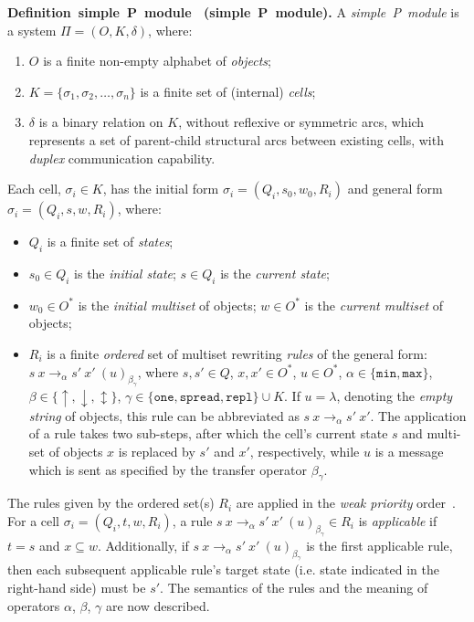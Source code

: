 \documentclass[preliminary,copyright,creativecommons]{eptcs}
\newenvironment{definition}[1][]
   {\refstepcounter{theorem} \par\medskip\noindent
   {\bf Definition~\thetheorem \ifx #1 \else ~(#1)\fi.} 
\ignorespaces }
   {\par\medskip }
\theoremstyle{remark}
\newcommand{\modmin}{\mathtt{min}}
\newcommand{\modmax}{\mathtt{max}}
\newcommand{\modone}{\mathtt{one}}
\newcommand{\modspread}{\mathtt{spread}}
\newcommand{\modrepl}{\mathtt{repl}}
\begin{document}
\begin{definition}[simple~P~module]
\label{def:simple-P-module}
A \emph{simple~P~module} is a system $\Pi = (O, K, \delta)$, where:
\begin{enumerate}
  \item $O$ is a finite non-empty alphabet of \emph{objects};
  \item $K=\{\sigma_1,\sigma_2,\ldots,\sigma_n\}$ is a finite set of (internal) \emph{cells};
  \item $\delta$ is a binary relation on $K$,
      without reflexive or symmetric arcs,
	   which represents a set of parent-child structural arcs between existing cells, 
	   with \emph{duplex} communication capability.
\end{enumerate}

Each cell, $\sigma_i \in K$, 
has the initial form $\sigma_i = (Q_i, s_0, w_0, R_i)$ and 
general form $\sigma_i = (Q_i,s,w,R_i)$, where:  
\begin{itemize}
  \item $Q_i$ is a finite set of \emph{states};
  \item $s_0 \in Q_i$ is the \emph{initial state}; $s\in Q_i$ is the \emph{current
state};
  \item $w_0 \in {O}^*$ is the \emph{initial multiset} of objects;
   $w \in {O}^*$ is the \emph{current multiset} of objects;
  \item $R_i$ is a finite \emph{ordered} set of multiset rewriting \emph{rules} of the general form: 
        $s~x \rightarrow_{\alpha} s'~x'~(u)_{\beta_\gamma}$, 
        where $s,s'\in Q$, $x,x'\in {O}^*$, 
        $u \in {O}^*$, 
        $\alpha \in \{\modmin, \modmax\}$,
        $\beta \in \{\uparrow, \downarrow, \updownarrow\}$,
        $\gamma \in \{\modone, \modspread, \modrepl\} \cup K$.
        If $u=\lambda$, denoting the \emph{empty string} of objects, this rule can be 
abbreviated as $s~x \rightarrow_{\alpha} s'~x'$. The application of a rule takes two sub-steps, 
after which the cell's current state $s$ and multi-set of objects $x$ is replaced by $s'$ and $x'$,
respectively, while $u$ is a message which is sent as specified by the 
transfer operator $\beta_\gamma$.
\end{itemize}

The rules given by the ordered set(s) $R_i$ are applied in the \emph{weak priority} order~\cite{Paun2006}.
For a cell $\sigma_i = (Q_i, t, w, R_i)$, a rule $s~x \rightarrow_{\alpha}
s'~x'~(u)_{\beta_\gamma} \in R_i$
is \emph{applicable} if $t = s$ and $x \subseteq w$.
Additionally, if $s~x \rightarrow_{\alpha} s'~x'~(u)_{\beta_\gamma}$ is the first applicable rule,
then each subsequent applicable rule's target state 
(i.e. state indicated in the right-hand side) must be $s'$.
The semantics of the rules and the meaning of operators $\alpha$,
$\beta$, $\gamma$ are now described.
\end{definition}
\end{document}
